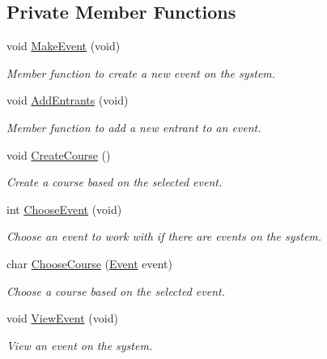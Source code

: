 \subsection*{\-Private \-Member \-Functions}
\begin{DoxyCompactItemize}
\item 
void \hyperlink{classEventCreator_aa75feec3c8b162cdc0ec722cb790d89b}{\-Make\-Event} (void)
\begin{DoxyCompactList}\small\item\em \-Member function to create a new event on the system. \end{DoxyCompactList}\item 
void \hyperlink{classEventCreator_ac08bc21732115a2c9120047e930d9c0a}{\-Add\-Entrants} (void)
\begin{DoxyCompactList}\small\item\em \-Member function to add a new entrant to an event. \end{DoxyCompactList}\item 
void \hyperlink{classEventCreator_ac138263790915b9ada256dd1f1c1db35}{\-Create\-Course} ()
\begin{DoxyCompactList}\small\item\em \-Create a course based on the selected event. \end{DoxyCompactList}\item 
int \hyperlink{classEventCreator_a074ab8233bb96a3b8ced83d256065753}{\-Choose\-Event} (void)
\begin{DoxyCompactList}\small\item\em \-Choose an event to work with if there are events on the system. \end{DoxyCompactList}\item 
char \hyperlink{classEventCreator_aee16394ee17f9e82879f271deda9fc41}{\-Choose\-Course} (\hyperlink{classEvent}{\-Event} event)
\begin{DoxyCompactList}\small\item\em \-Choose a course based on the selected event. \end{DoxyCompactList}\item 
void \hyperlink{classEventCreator_a9451c2b14b634beae55ca2deb31db8d9}{\-View\-Event} (void)
\begin{DoxyCompactList}\small\item\em \-View an event on the system. \end{DoxyCompactList}\end{DoxyCompactItemize}

